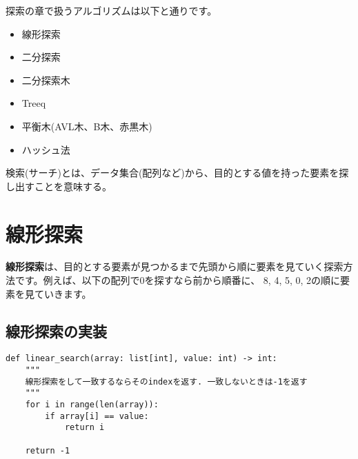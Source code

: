 \documentclass{jlreq}
\begin{document}
探索の章で扱うアルゴリズムは以下と通りです。

\begin{itemize}
  \item 線形探索
  \item 二分探索
  \item 二分探索木
  \item Treeq
  \item 平衡木(AVL木、B木、赤黒木)
  \item ハッシュ法
\end{itemize}

検索(サーチ)とは、データ集合(配列など)から、目的とする値を持った要素を探し出すことを意味する。

\section{線形探索}

\textbf{線形探索}は、目的とする要素が見つかるまで先頭から順に要素を見ていく探索方法です。例えば、以下の配列で0を探すなら前から順番に、
8, 4, 5, 0, 2の順に要素を見ていきます。

\vspace{0.5cm}

\begin{center}
\end{center}

\subsection{線形探索の実装}
\begin{lstlisting}[caption=線形探索の実装, frame=TRBL, label={linear}]
def linear_search(array: list[int], value: int) -> int:
    """
    線形探索をして一致するならそのindexを返す. 一致しないときは-1を返す
    """
    for i in range(len(array)):
        if array[i] == value:
            return i
    
    return -1


\end{lstlisting}
\end{document}
